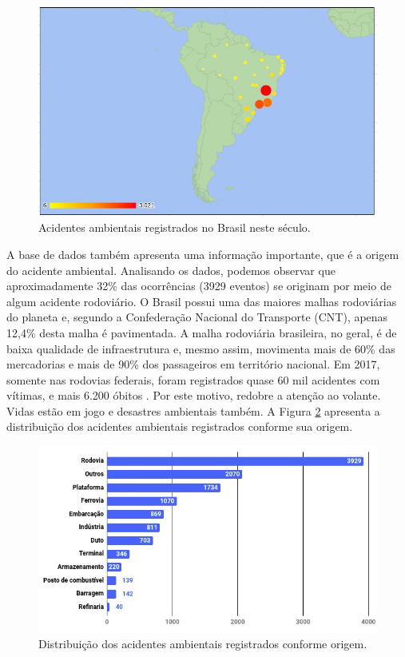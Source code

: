 \begin{figure}[!h]
    \includegraphics[scale=0.45]{fig/mapa_ocorrencias.jpeg}
    \centering
    \caption{Acidentes ambientais registrados no Brasil neste século.}
    \label{fig:ocorrencias}
\end{figure}


A base de dados também apresenta uma informação importante, que é a origem do acidente ambiental. Analisando os dados, podemos observar que aproximadamente 32\% das ocorrências (3929 eventos) se originam por meio de algum acidente rodoviário. O Brasil possui uma das maiores malhas rodoviárias do planeta e, segundo a Confederação Nacional do Transporte (CNT), apenas 12,4\% desta malha é pavimentada. A malha rodoviária brasileira, no geral, é de baixa qualidade de infraestrutura e, mesmo assim, movimenta mais de 60\% das mercadorias e mais de 90\% dos passageiros em território nacional. Em 2017, somente nas rodovias federais, foram registrados quase 60 mil acidentes com vítimas, e mais 6.200 óbitos \cite{cnt2021}. Por este motivo, redobre a atenção ao volante. Vidas estão em jogo e desastres ambientais também. A Figura \ref{fig:origens} apresenta a distribuição dos acidentes ambientais registrados conforme sua origem.

\begin{figure}[!h]
    \includegraphics[scale=0.55]{fig/origens.jpeg}
    \centering
    \caption{Distribuição dos acidentes ambientais registrados conforme origem.}
    \label{fig:origens}
\end{figure}


